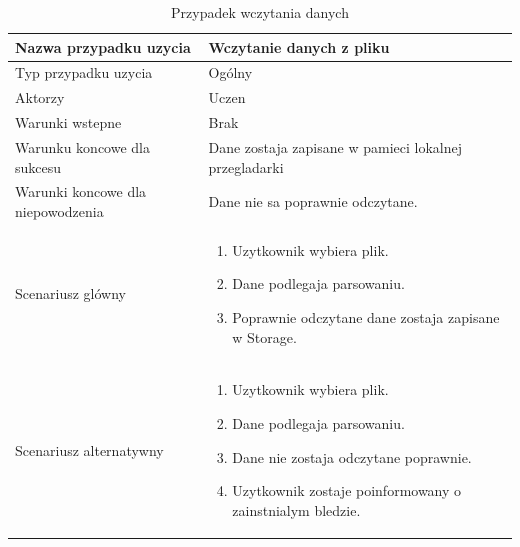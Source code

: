 \begin{table}[H]
    \centering
    \begin{tabular}{|l<{\raggedright}|p{3in}|}
    \hline
    Nazwa przypadku uzycia & Wczytanie danych z pliku  \\ \hline
    Typ przypadku uzycia  & Ogólny  \\ \hline
    Aktorzy   & Uczen    \\ \hline
    Warunki wstepne   & Brak     \\ \hline
    Warunku koncowe dla sukcesu   & Dane zostaja zapisane w pamieci lokalnej przegladarki    \\ \hline
    Warunki koncowe dla niepowodzenia   & Dane nie sa poprawnie odczytane.     \\ \hline
    Scenariusz glówny   &

    \begin{enumerate}
    \itemsep0em
        \item Uzytkownik wybiera plik.
        \item Dane podlegaja parsowaniu.
        \item Poprawnie odczytane dane zostaja zapisane w Storage.
    \end{enumerate}
     \\ \hline
    Scenariusz alternatywny   &

    \begin{enumerate}
    \itemsep0em
        \item Uzytkownik wybiera plik.
        \item Dane podlegaja parsowaniu.
        \item Dane nie zostaja odczytane poprawnie.
        \item Uzytkownik zostaje poinformowany o zainstnialym bledzie.
    \end{enumerate}
         \\ \hline
    \end{tabular}
    \caption{Przypadek wczytania danych}
    \label{tab:caseuse1}
\end{table}


